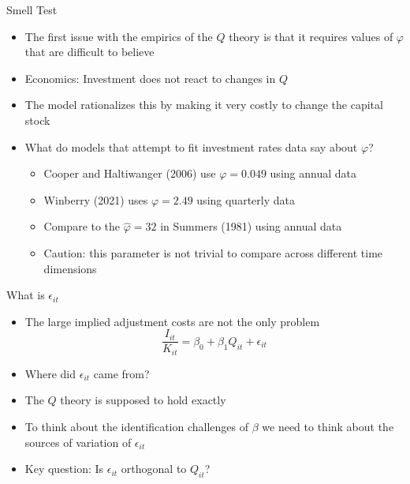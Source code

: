 \documentclass[11pt,aspectratio=169,xcolor={dvipsnames},hyperref={pdftex,pdfpagemode=UseNone,hidelinks,pdfdisplaydoctitle=true},usepdftitle=false]{beamer}
\begin{document}
\begin{frame}{Smell Test}
\begin{itemize}
\item The first issue with the empirics of the $Q$ theory is that it requires values of $\varphi$ that are difficult to believe
\pause
\item Economics: Investment does not react to changes in $Q$
\pause
\item The model rationalizes this by making it very costly to change the capital stock
\pause
\item What do models that attempt to fit investment rates data say about $\varphi$?
\pause
\begin{itemize}
\item Cooper and Haltiwanger (2006) use $\varphi = 0.049$ using annual data
\item Winberry (2021) uses $\varphi = 2.49$ using quarterly data
\item Compare to the $\hat{\varphi} = 32$ in Summers (1981) using annual data
\pause
\item Caution: this parameter is not trivial to compare across different time dimensions
\end{itemize}
\end{itemize}
\end{frame}

\begin{frame}{What is $\epsilon_{it}$}
\begin{itemize}
\item The large implied adjustment costs are not the only problem
\pause
$$\frac{I_{it}}{K_{it}} = \beta_0 + \beta_1 Q_{it}  + \epsilon_{it}$$
\vspace{-0.5cm}
\pause
\item Where did $\epsilon_{it}$ came from?
\pause
\item The $Q$ theory is supposed to hold exactly
\pause
\item To think about the identification challenges of $\beta$ we need to think about the sources of variation of $\epsilon_{it}$
\pause
\item Key question: Is $\epsilon_{it}$ orthogonal to $Q_{it}$?
\end{itemize}
\end{frame}
\end{document}
